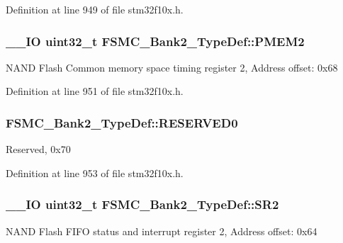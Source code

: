 Definition at line 949 of file stm32f10x.\-h.

\hypertarget{struct_f_s_m_c___bank2___type_def_a29b2b75e74520e304e31c18cf9e4a7f8}{
\subsubsection[{P\-M\-E\-M2}]{\setlength{\rightskip}{0pt plus 5cm}\-\_\-\-\_\-\-I\-O {\bf uint32\-\_\-t} F\-S\-M\-C\-\_\-\-Bank2\-\_\-\-Type\-Def\-::\-P\-M\-E\-M2}}\label{struct_f_s_m_c___bank2___type_def_a29b2b75e74520e304e31c18cf9e4a7f8}
N\-A\-N\-D Flash Common memory space timing register 2, Address offset\-: 0x68 

Definition at line 951 of file stm32f10x.\-h.

\hypertarget{struct_f_s_m_c___bank2___type_def_ac0433330a92f2bd04812384f63bb4a52}{
\subsubsection[{R\-E\-S\-E\-R\-V\-E\-D0}]{ F\-S\-M\-C\-\_\-\-Bank2\-\_\-\-Type\-Def\-::\-R\-E\-S\-E\-R\-V\-E\-D0}}\label{struct_f_s_m_c___bank2___type_def_ac0433330a92f2bd04812384f63bb4a52}
Reserved, 0x70 

Definition at line 953 of file stm32f10x.\-h.

\hypertarget{struct_f_s_m_c___bank2___type_def_a38ad7403e05c899dc266cf47f932cc8f}{
\subsubsection[{S\-R2}]{\setlength{\rightskip}{0pt plus 5cm}\-\_\-\-\_\-\-I\-O {\bf uint32\-\_\-t} F\-S\-M\-C\-\_\-\-Bank2\-\_\-\-Type\-Def\-::\-S\-R2}}\label{struct_f_s_m_c___bank2___type_def_a38ad7403e05c899dc266cf47f932cc8f}
N\-A\-N\-D Flash F\-I\-F\-O status and interrupt register 2, Address offset\-: 0x64 

